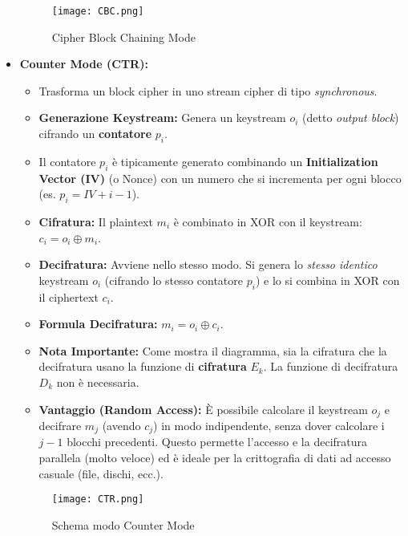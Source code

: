\documentclass[../main.tex]{subfiles}
\begin{document}
\begin{itemize}
	      \begin{figure}[H]
	      	\centering
	      	\texttt{[image: CBC.png]}
	      	\caption{Cipher Block Chaining Mode}
	      	\label{fig:etichetta}
	      \end{figure}
	                
	\item \textbf{Counter Mode (CTR):}
	     \begin{itemize}
    \item Trasforma un block cipher in uno stream cipher di tipo \emph{synchronous}.
    \item \textbf{Generazione Keystream:} Genera un keystream $o_i$ (detto \emph{output block}) cifrando un \textbf{contatore} $p_i$.
    \item Il contatore $p_i$ è tipicamente generato combinando un \textbf{Initialization Vector (IV)} (o Nonce) con un numero che si incrementa per ogni blocco (es. $p_i = IV + i - 1$).
    \item \textbf{Cifratura:} Il plaintext $m_i$ è combinato in XOR con il keystream: $c_i = o_i \oplus m_i$.
    \item \textbf{Decifratura:} Avviene nello stesso modo. Si genera lo \emph{stesso identico} keystream $o_i$ (cifrando lo stesso contatore $p_i$) e lo si combina in XOR con il ciphertext $c_i$.
    \item \textbf{Formula Decifratura:} $m_i = o_i \oplus c_i$.
    \item \textbf{Nota Importante:} Come mostra il diagramma, sia la cifratura che la decifratura usano la funzione di \textbf{cifratura} $E_k$. La funzione di decifratura $D_k$ non è necessaria.
    \item \textbf{Vantaggio (Random Access):} È possibile calcolare il keystream $o_j$ e decifrare $m_j$ (avendo $c_j$) in modo indipendente, senza dover calcolare i $j-1$ blocchi precedenti. Questo permette l'accesso e la decifratura parallela (molto veloce) ed è ideale per la crittografia di dati ad accesso casuale (file, dischi, ecc.).
\end{itemize}
	                
	      \begin{figure}[H]
	      	\centering
	      	\texttt{[image: CTR.png]}
	      	\caption{Schema modo Counter Mode}
	      	\label{fig:etichetta}
	      \end{figure}
\end{itemize}

\label{sec:funzioni-hash}
\end{document}
